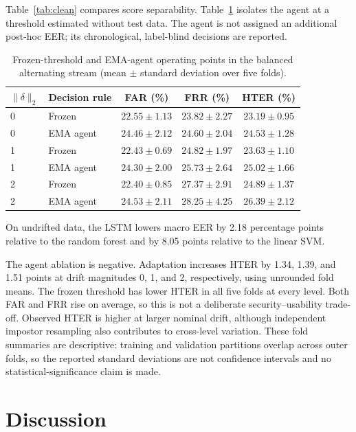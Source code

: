 \documentclass[3p,times,procedia]{elsarticle}
\begin{document}
Table~\ref{tab:clean} compares score separability. Table~\ref{tab:ablation}
isolates the agent at a threshold estimated without test data. The agent is not
assigned an additional post-hoc EER; its chronological, label-blind decisions are reported.

\begin{table}[H]
\centering
\small
\caption{Frozen-threshold and EMA-agent operating points in the balanced
alternating stream (mean $\pm$ standard deviation over five folds).}
\label{tab:ablation}
\begin{tabular}{llccc}
\toprule
$\lVert\delta\rVert_2$ & Decision rule & FAR (\%) & FRR (\%) & HTER (\%) \\
\midrule
0 & Frozen & $22.55\pm1.13$ & $23.82\pm2.27$ & $23.19\pm0.95$ \\
0 & EMA agent & $24.46\pm2.12$ & $24.60\pm2.04$ & $24.53\pm1.28$ \\
1 & Frozen & $22.43\pm0.69$ & $24.82\pm1.97$ & $23.63\pm1.10$ \\
1 & EMA agent & $24.30\pm2.00$ & $25.73\pm2.64$ & $25.02\pm1.66$ \\
2 & Frozen & $22.40\pm0.85$ & $27.37\pm2.91$ & $24.89\pm1.37$ \\
2 & EMA agent & $24.53\pm2.11$ & $28.25\pm4.25$ & $26.39\pm2.12$ \\
\bottomrule
\end{tabular}
\end{table}

On undrifted data, the LSTM lowers macro EER by 2.18 percentage points relative to
the random forest and by 8.05 points relative to the linear SVM.

The agent ablation is negative. Adaptation increases HTER by 1.34, 1.39, and
1.51 points at drift magnitudes 0, 1, and 2, respectively, using unrounded fold
means. The frozen threshold has lower HTER in all five folds at every level.
Both FAR and FRR rise on average, so this is not a deliberate security--usability
trade-off. Observed HTER is higher at larger nominal drift, although independent
impostor resampling also contributes to cross-level variation.
These fold summaries are descriptive: training and validation partitions
overlap across outer folds, so the reported standard deviations are not
confidence intervals and no statistical-significance claim is made.

\section{Discussion}
\label{sec:discussion}
\end{document}
